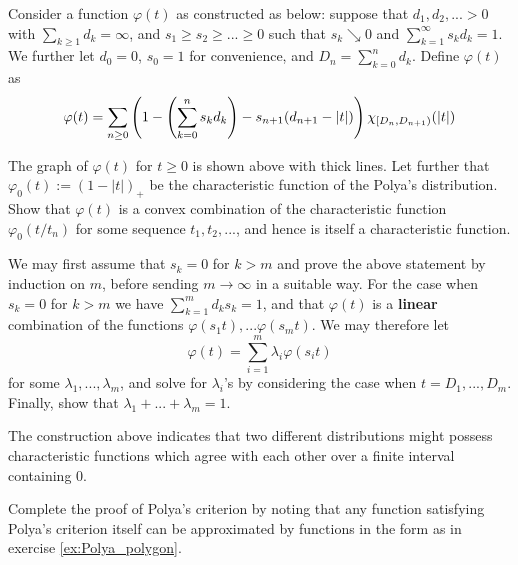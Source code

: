 \begin{unexaminable}
\begin{exercise} \label{ex:Polya_polygon}
Consider a function $\varphi(t)$ as constructed as below: suppose that $d_1, d_2, ... > 0$ with $\sum_{k\geq 1} d_k = \infty$, and $s_1 \geq s_2 \geq ... \geq 0$ such that $s_k \searrow 0$ and $\sum_{k=1}^\infty s_k d_k = 1$. We further let $d_0 = 0$, $s_0 = 1$ for convenience, and $D_n = \sum_{k=0}^n d_k$. Define $\varphi(t)$ as 
\begin{equation}
    \varphi(t) = \sum_{n\geq 0} \left( 1 - \left( \sum_{k=0}^n s_k d_k \right) - s_{n+1} (d_{n+1}-|t|) \right) \chi_{[D_n, D_{n+1})}(|t|)
\end{equation}
\begin{center}
    
\end{center}
The graph of $\varphi(t)$ for $t\geq 0$ is shown above with thick lines. Let further that $\varphi_0(t) := (1-|t|)_+$ be the characteristic function of the Polya's distribution. Show that $\varphi(t)$ is a convex combination of the characteristic function $\varphi_0(t/t_n)$ for some sequence $t_1, t_2, ...$, and hence is itself a characteristic function.
\end{exercise}

\begin{hint}
We may first assume that $s_k = 0$ for $k > m$ and prove the above statement by induction on $m$, before sending $m \to \infty$ in a suitable way. For the case when $s_k = 0$ for $k > m$ we have $\sum_{k=1}^m d_k s_k = 1$, and that $\varphi(t)$ is a \textbf{linear} combination of the functions $\varphi(s_1 t), ... \varphi(s_m t)$. We may therefore let
\begin{equation}
    \varphi(t) = \sum_{i=1}^m \lambda_i \varphi(s_i t)
\end{equation}
for some $\lambda_1,...,\lambda_m$, and solve for $\lambda_i$'s by considering the case when $t = D_1,...,D_m$. Finally, show that $\lambda_1 + ... + \lambda_m = 1$.
\end{hint}

\begin{remark}
The construction above indicates that two different distributions might possess characteristic functions which agree with each other over a finite interval containing $0$.
\end{remark}

\begin{exercise}
Complete the proof of Polya's criterion by noting that any function satisfying Polya's criterion itself can be approximated by functions in the form as in exercise \ref{ex:Polya_polygon}.
\end{exercise}


\end{unexaminable}
